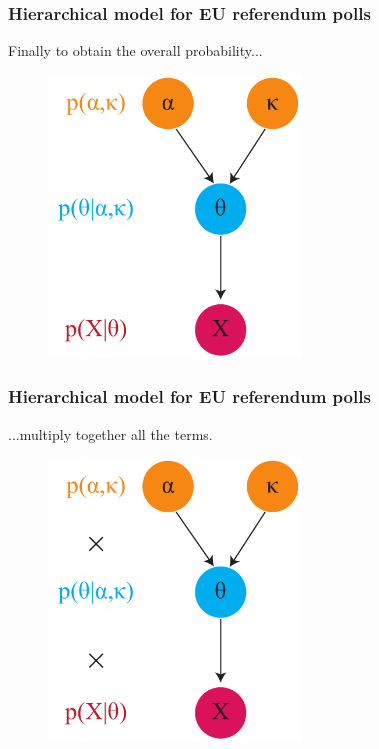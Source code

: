 \documentclass[handout]{beamer}
\begin{document}
\begin{frame}
	\frametitle{Hierarchical model for EU referendum polls}
	
	Finally to obtain the overall probability...
	
	\begin{figure}[ht]
		\centerline{\includegraphics[width=0.6\textwidth]{figures/lec6_conditionalIndependence1.pdf}}
	\end{figure}
	
\end{frame}

\begin{frame}
	\frametitle{Hierarchical model for EU referendum polls}
	
	...multiply together all the terms.
	
	\begin{figure}[ht]
		\centerline{\includegraphics[width=0.6\textwidth]{figures/lec6_conditionalIndependence0.pdf}}
	\end{figure}
	
\end{frame}
\end{document}
